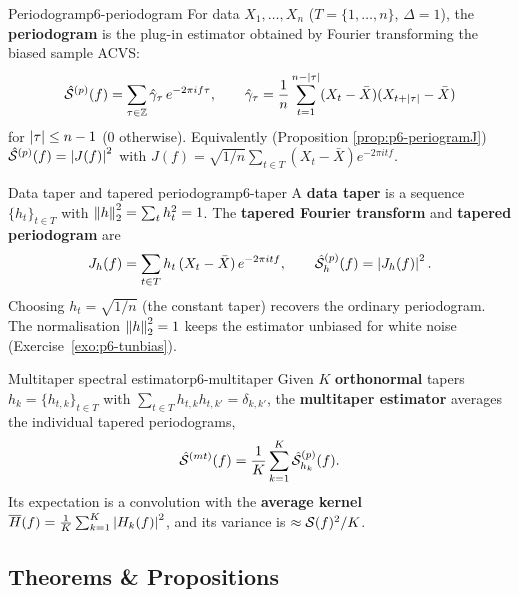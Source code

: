 \begin{definition}{Periodogram}{p6-periodogram}
For data $X_1,\dots,X_n$ ($T=\{1,\dots,n\}$, $\Delta=1$), the
\textbf{periodogram} is the plug-in estimator obtained by Fourier transforming
the biased sample ACVS:
\[
\hat{\mathcal{S}}^{(p)}(f)=\sum_{\tau\in\mathbb{Z}}\hat{\gamma}_\tau\,e^{-2\pi i f\tau},
\qquad
\hat{\gamma}_\tau=\frac1n\sum_{t=1}^{n-\left\lvert \tau \right\rvert}(X_t-\bar X)(X_{t+\left\lvert \tau \right\rvert}-\bar X)
\]
for $\left\lvert \tau \right\rvert\le n-1$ ($0$ otherwise). Equivalently (Proposition
\ref{prop:p6-periogramJ}) $\hat{\mathcal{S}}^{(p)}(f)=\left\lvert J(f) \right\rvert^2$ with
$J(f)=\sqrt{1/n}\sum_{t\in T}(X_t-\bar X)e^{-2\pi i t f}$.
\end{definition}

\begin{definition}{Data taper and tapered periodogram}{p6-taper}
A \textbf{data taper} is a sequence $\{h_t\}_{t\in T}$ with
$\left\lVert h \right\rVert_2^2=\sum_t h_t^2=1$. The \textbf{tapered Fourier transform} and
\textbf{tapered periodogram} are
\[
J_h(f)=\sum_{t\in T} h_t\,(X_t-\bar X)\,e^{-2\pi i t f},
\qquad
\hat{\mathcal{S}}^{(p)}_h(f)=\left\lvert J_h(f) \right\rvert^2 .
\]
Choosing $h_t=\sqrt{1/n}$ (the constant taper) recovers the ordinary
periodogram. The normalisation $\left\lVert h \right\rVert_2^2=1$ keeps the estimator unbiased
for white noise (Exercise~\ref{exo:p6-tunbias}).
\end{definition}

\begin{definition}{Multitaper spectral estimator}{p6-multitaper}
Given $K$ \textbf{orthonormal} tapers $h_k=\{h_{t,k}\}_{t\in T}$ with
$\sum_{t\in T} h_{t,k}h_{t,k'}=\delta_{k,k'}$, the \textbf{multitaper
estimator} averages the individual tapered periodograms,
\[
\hat{\mathcal{S}}^{(mt)}(f)=\frac1K\sum_{k=1}^{K}\hat{\mathcal{S}}^{(p)}_{h_k}(f).
\]
Its expectation is a convolution with the \textbf{average kernel}
$\overline H(f)=\tfrac1K\sum_{k=1}^K\left\lvert H_k(f) \right\rvert^2$, and its variance is
$\approx\mathcal{S}(f)^2/K$.
\end{definition}

\subsection{Theorems \& Propositions}

